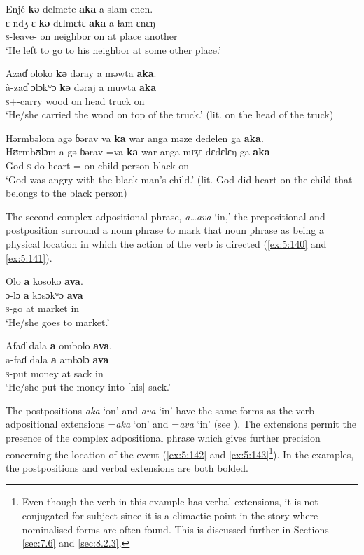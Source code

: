 \ea \label{ex:5:137}
Enjé  \textbf{kə} delmete  \textbf{aka} a  slam  enen.\\
\gll  ɛ{}-ndʒ{}-ɛ    \textbf{kə} dɛlmɛtɛ \textbf{aka} a  ɬam  ɛnɛŋ\\
      \textsc{s}-leave-{\CL}    on  neighbor    on  at  place  another\\
\glt  ‘He left to go to his neighbor at some other place.’  
\z

\ea \label{ex:5:138}
Azaɗ  oloko  \textbf{kə}  dəray  a  məwta  \textbf{aka}.\\
\gll  à-zaɗ    ɔlɔkʷɔ  \textbf{kə}  dəraj  a  muwta  \textbf{aka}\\
      \textsc{s}+{\PFV}-carry  wood  on  head  {\GEN}  truck  on\\
\glt  ‘He/she carried the wood on top of the truck.’ (lit. on the head of the truck)
\z

\ea \label{ex:5:139}
Hərmbəlom  agə  ɓərav  va  \textbf{ka} war  anga  məze  dedelen  ga \textbf{aka}.\\
\gll  Hʊrmbʊlɔm  a-gə  ɓərav  =va  \textbf{ka} war  aŋga  mɪʒɛ  dɛdɛlɛŋ  ga \textbf{aka}\\
      God    \textsc{s}-do  heart  ={\PRF}  on  child  {\POSS}  person  black  {\ADJ}  on\\
\glt  ‘God was angry with the black man’s child.’  (lit. God did heart on the child that belongs to the black person)
\z

The second complex adpositional phrase, \textit{a…ava} ‘in,’ the prepositional and postposition surround a noun phrase to mark that noun phrase as being a physical location in which the action of the verb is directed (\ref{ex:5:140} and \ref{ex:5:141}).

\ea \label{ex:5:140}
Olo  \textbf{a}  kosoko  \textbf{ava}.\\
\gll  ɔ{}-lɔ    \textbf{a}  kɔsɔkʷɔ  \textbf{ava}\\
      \textsc{s}-go  at  market  in\\
\glt  ‘He/she goes to market.’
\z

\ea \label{ex:5:141}
Afaɗ  dala  \textbf{a}  ombolo  \textbf{ava}.\\
\gll  a-faɗ  dala  \textbf{a}  ambɔlɔ  \textbf{ava}\\
      \textsc{s}-put  money  at  sack  in\\
\glt  ‘He/she put the money into [his] sack.’
\z

The postpositions \textit{aka} ‘on’ and \textit{ava} ‘in’ have the same forms as the verb adpositional extensions =\textit{aka} ‘on’ and =\textit{ava}  ‘in’ (see ). The extensions permit the presence of the complex adpositional phrase which gives further precision concerning the location of the event (\ref{ex:5:142} and \ref{ex:5:143}\footnote{Even though the verb in this example has verbal extensions, it is not conjugated for subject since it is a climactic point in the story where nominalised forms are often found.  This is discussed further in Sections \ref{sec:7.6} and \ref{sec:8.2.3}.}). In the examples, the postpositions and verbal extensions are both bolded. 


